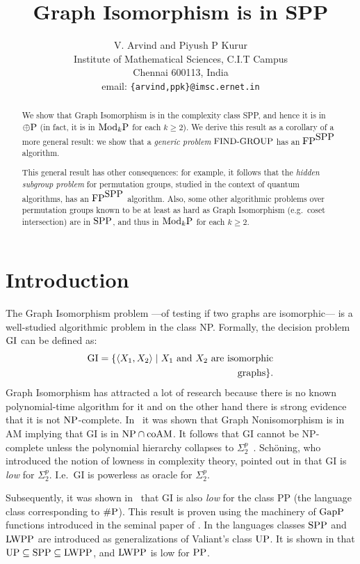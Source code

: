 \documentclass{article}
\title{{\bf Graph Isomorphism is in SPP}}
\author{
  V. Arvind  and Piyush P Kurur \\
  Institute of Mathematical Sciences, C.I.T Campus\\ 
  Chennai 600113, India\\
  email: {\tt\{arvind,ppk\}@imsc.ernet.in}\\
}
\date{}
\newcommand{\UP}{\mbox{\rm UP}}
\newcommand{\PP}{\mbox{\rm PP}}
\newcommand{\GapP}{\mbox{\rm GapP}}
\newcommand{\NP}{\mbox{\rm NP}}
\newcommand{\FP}{\mbox{\rm FP}}
\newcommand{\ParityP}{\mbox{$\oplus$\rm P}}
\newcommand{\ModkP}{\mbox{\rm Mod$_k$P}}
\newcommand{\numP}{\mbox{\rm \#P}}
\newcommand{\LWPP}{\mbox{\rm LWPP}}
\newcommand{\SPP}{\mbox{\rm SPP}}
\newcommand{\coAM}{\mbox{\rm coAM}}
\newcommand{\FINDGROUP}{\mbox{\small\rm FIND{-}GROUP}}
\newcommand{\GI}{{\rm{GI}}}
\renewcommand{\angle}[1]{\langle #1\rangle}
\begin{document}
\maketitle

\begin{abstract}
  We show that Graph Isomorphism is in the complexity class SPP, and
  hence it is in $\ParityP$ (in fact, it is in $\ModkP$ for each
  $k\geq 2$). We derive this result as a corollary of a more general
  result: we show that a {\em generic problem} $\FINDGROUP$ has an
  $\FP^{\SPP}$ algorithm.
  
  This general result has other consequences: for example, it follows
  that the {\em hidden subgroup problem} for permutation groups,
  studied in the context of quantum algorithms, has an $\FP^{\SPP}$
  algorithm. Also, some other algorithmic problems over permutation
  groups known to be at least as hard as Graph Isomorphism (e.g.\ 
  coset intersection) are in $\SPP$, and thus in $\ModkP$ for each
  $k\geq 2$.
\end{abstract}

\section{Introduction}

The Graph Isomorphism problem ---of testing if two graphs are
isomorphic--- is a well-studied algorithmic problem in the class NP.
Formally, the decision problem $\GI$ can be defined as:
\begin{eqnarray*}
\GI=\{\angle{X_1,X_2}\mid X_1\mbox{ and }X_2\mbox{ are isomorphic}\\
\mbox{ graphs}\}. 
\end{eqnarray*}
Graph Isomorphism has attracted a lot of research because there is no
known polynomial-time algorithm for it and on the other hand there is
strong evidence that it is not $\NP$-complete. In~\cite{boppana87does}
it was shown that Graph Nonisomorphism is in AM implying that GI is in
$\NP\cap\coAM$. It follows that GI cannot be NP-complete unless the
polynomial hierarchy collapses to
$\Sigma^p_2$~\cite{boppana87does,schoning87graph}. Sch\"oning, who
introduced the notion of lowness in complexity theory, pointed out in
\cite{schoning87graph} that GI is {\em low\/} for $\Sigma^p_2$.  I.e.\ 
GI is powerless as oracle for $\Sigma^p_2$.

Subsequently, it was shown in~\cite{kobler92graph} that GI is also
{\em low\/} for the class PP (the language class corresponding to
$\numP$). This result is proven using the machinery of $\GapP$
functions introduced in the seminal paper of
\cite{fenner91gapdefinable}. In \cite{fenner91gapdefinable} the
languages classes $\SPP$ and $\LWPP$ are introduced as generalizations
of Valiant's class $\UP$. It is shown in \cite{fenner91gapdefinable}
that $\UP\subseteq\SPP\subseteq\LWPP$, and $\LWPP$ is low for $\PP$.
\end{document}
